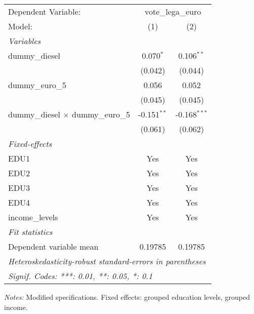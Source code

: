 
\begingroup
\centering
\begin{tabular}{lcc}
   \tabularnewline \midrule \midrule
   Dependent Variable: & \multicolumn{2}{c}{vote\_lega\_euro}\\
   Model:                                    & (1)           & (2)\\  
   \midrule
   \emph{Variables}\\
   dummy\_diesel                             & 0.070$^{*}$   & 0.106$^{**}$\\   
                                             & (0.042)       & (0.044)\\   
   dummy\_euro\_5                            & 0.056         & 0.052\\   
                                             & (0.045)       & (0.045)\\   
   dummy\_diesel $\times$ dummy\_euro\_5     & -0.151$^{**}$ & -0.168$^{***}$\\   
                                             & (0.061)       & (0.062)\\   
   \midrule
   \emph{Fixed-effects}\\
   EDU1                                      & Yes           & Yes\\  
   EDU2                                      & Yes           & Yes\\  
   EDU3                                      & Yes           & Yes\\  
   EDU4                                      & Yes           & Yes\\  
   income\_levels                            & Yes           & Yes\\  
   \midrule
   \emph{Fit statistics}\\
   Dependent variable mean                   & 0.19785       & 0.19785\\  
   \midrule \midrule
   \multicolumn{3}{l}{\emph{Heteroskedasticity-robust standard-errors in parentheses}}\\
   \multicolumn{3}{l}{\emph{Signif. Codes: ***: 0.01, **: 0.05, *: 0.1}}\\
\end{tabular}
 
\par \raggedright 
\textit{Notes:} Modified specifications. Fixed effects: grouped education levels, grouped income.
\par\endgroup


